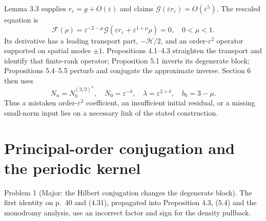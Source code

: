 \documentclass[10pt]{article}
\begin{document}
Lemma 3.3 supplies \(r_\varepsilon=g+O(\varepsilon)\) and claims \(\mathcal G(\varepsilon r_\varepsilon)=O(\varepsilon^5)\). The rescaled equation is \[\mathcal F(\rho)=\varepsilon^{-2-\mu}
       \mathcal G(\varepsilon r_\varepsilon+\varepsilon^{1+\mu}\rho)=0,\quad 0<\mu<1.\] Its derivative has a leading transport part, \(-\mathcal H/2\), and an order-\(\varepsilon^2\) operator supported on spatial modes \(\pm1\). Propositions 4.1–4.3 straighten the transport and identify that finite-rank operator; Proposition 5.1 inverts its degenerate block; Propositions 5.4–5.5 perturb and conjugate the approximate inverse. Section 6 then uses \[N_n=N_0^{(3/2)^n},\quad N_0=\varepsilon^{-\delta},\quad
 \lambda=\varepsilon^{2+\delta},\quad b_0=3-\mu .\] Thus a mistaken order-\(\varepsilon^2\) coefficient, an insufficient initial residual, or a missing small-norm input lies on a necessary link of the stated construction.\par
\section*{Principal-order conjugation and the periodic kernel}
Problem 1 (Major: the Hilbert conjugation changes the degenerate block).  The first identity on p. 40 and (4.31), propagated into Proposition 4.3, (5.4) and the monodromy analysis, use an incorrect factor and sign for the density pullback.\par
\end{document}
